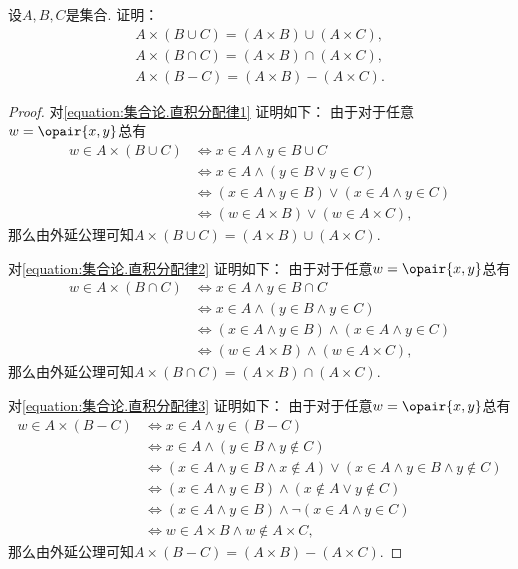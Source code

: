 \begin{example}
设\(A,B,C\)是集合.
证明：\begin{gather}
	A \times (B \cup C) = (A \times B) \cup (A \times C),
	\label{equation:集合论.直积分配律1} \\
	A \times (B \cap C) = (A \times B) \cap (A \times C),
	\label{equation:集合论.直积分配律2} \\
	A \times (B - C) = (A \times B) - (A \times C).
	\label{equation:集合论.直积分配律3}
\end{gather}
\begin{proof}
对\cref{equation:集合论.直积分配律1} 证明如下：
由于对于任意\(w = \opair{x,y}\)总有
\begin{align*}
	w \in A \times (B \cup C)
	&\iff x \in A \land y \in B \cup C \\
	&\iff x \in A \land (y \in B \lor y \in C) \\
	&\iff (x \in A \land y \in B) \lor (x \in A \land y \in C) \\
	&\iff (w \in A \times B) \lor (w \in A \times C),
\end{align*}
那么由外延公理可知\(A \times (B \cup C) = (A \times B) \cup (A \times C)\).

对\cref{equation:集合论.直积分配律2} 证明如下：
由于对于任意\(w = \opair{x,y}\)总有
\begin{align*}
	w \in A \times (B \cap C)
	&\iff x \in A \land y \in B \cap C \\
	&\iff x \in A \land (y \in B \land y \in C) \\
	&\iff (x \in A \land y \in B) \land (x \in A \land y \in C) \\
	&\iff (w \in A \times B) \land (w \in A \times C),
\end{align*}
那么由外延公理可知\(A \times (B \cap C) = (A \times B) \cap (A \times C)\).

对\cref{equation:集合论.直积分配律3} 证明如下：
由于对于任意\(w = \opair{x,y}\)总有
\begin{align*}
	w \in A \times (B - C)
	&\iff x \in A \land y \in (B - C) \\
	&\iff x \in A \land (y \in B \land y \notin C) \\
	&\iff (x \in A \land y \in B \land x \notin A)
		\lor (x \in A \land y \in B \land y \notin C) \\
	&\iff (x \in A \land y \in B) \land (x \notin A \lor y \notin C) \\
	&\iff (x \in A \land y \in B) \land \neg(x \in A \land y \in C) \\
	&\iff w \in A \times B \land w \notin A \times C,
\end{align*}
那么由外延公理可知\(A \times (B - C) = (A \times B) - (A \times C)\).
\end{proof}
\end{example}

